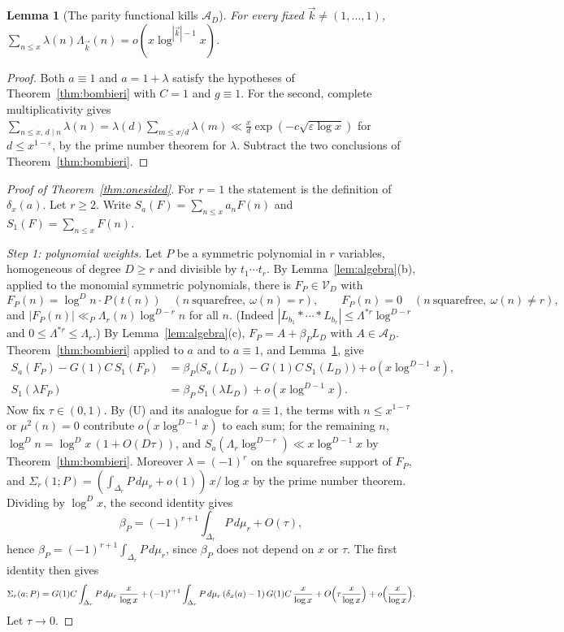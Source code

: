 \documentclass[11pt]{amsart}
\newtheorem{lemma}[theorem]{Lemma}
\theoremstyle{definition}
\theoremstyle{remark}
\begin{document}
\begin{lemma}[The parity functional kills $\mathcal A_D$]\label{lem:liouville}
For every fixed $\vec k\ne(1,\dots,1)$, $\sum_{n\le x}\lambda(n)\Lambda_{\vec k}(n)=o(x\log^{|\vec k|-1}x)$.
\end{lemma}
\begin{proof}
Both $a\equiv1$ and $a=1+\lambda$ satisfy the hypotheses of Theorem~\ref{thm:bombieri} with $C=1$ and $g\equiv1$. For the second, complete multiplicativity gives $\sum_{n\le x,\,d\mid n}\lambda(n)=\lambda(d)\sum_{m\le x/d}\lambda(m)\ll\frac xd\exp(-c\sqrt{\varepsilon\log x})$ for $d\le x^{1-\varepsilon}$, by the prime number theorem for $\lambda$. Subtract the two conclusions of Theorem~\ref{thm:bombieri}.
\end{proof}

\begin{proof}[Proof of Theorem~\ref{thm:onesided}]
For $r=1$ the statement is the definition of $\delta_x(a)$. Let $r\ge2$. Write $S_a(F)=\sum_{n\le x}a_nF(n)$ and $S_1(F)=\sum_{n\le x}F(n)$.

\emph{Step 1: polynomial weights.} Let $P$ be a symmetric polynomial in $r$ variables, homogeneous of degree $D\ge r$ and divisible by $t_1\cdots t_r$. By Lemma~\ref{lem:algebra}(b), applied to the monomial symmetric polynomials, there is $F_P\in\mathcal V_D$ with
\[
F_P(n)=\log^Dn\cdot P(t(n))\quad(n\ \text{squarefree},\ \omega(n)=r),\qquad F_P(n)=0\quad(n\ \text{squarefree},\ \omega(n)\ne r),
\]
and $|F_P(n)|\ll_P\Lambda_r(n)\log^{D-r}n$ for all $n$. (Indeed $|L_{b_1}*\cdots*L_{b_r}|\le\Lambda^{*r}\log^{D-r}$ and $0\le\Lambda^{*r}\le\Lambda_r$.) By Lemma~\ref{lem:algebra}(c), $F_P=A+\beta_PL_D$ with $A\in\mathcal A_D$. Theorem~\ref{thm:bombieri} applied to $a$ and to $a\equiv1$, and Lemma~\ref{lem:liouville}, give
\begin{align*}
S_a(F_P)-G(1)C\,S_1(F_P)&=\beta_P\bigl(S_a(L_D)-G(1)C\,S_1(L_D)\bigr)+o(x\log^{D-1}x),\\
S_1(\lambda F_P)&=\beta_P\,S_1(\lambda L_D)+o(x\log^{D-1}x).
\end{align*}
Now fix $\tau\in(0,1)$. By (U) and its analogue for $a\equiv1$, the terms with $n\le x^{1-\tau}$ or $\mu^2(n)=0$ contribute $o(x\log^{D-1}x)$ to each sum; for the remaining $n$, $\log^Dn=\log^Dx\,(1+O(D\tau))$, and $S_a(\Lambda_r\log^{D-r})\ll x\log^{D-1}x$ by Theorem~\ref{thm:bombieri}. Moreover $\lambda=(-1)^r$ on the squarefree support of $F_P$, and $\Sigma_r(1;P)=(\int_{\Delta_r}P\,d\mu_r+o(1))\,x/\log x$ by the prime number theorem. Dividing by $\log^Dx$, the second identity gives
\[
\beta_P=(-1)^{r+1}\int_{\Delta_r}P\,d\mu_r+O(\tau),
\]
hence $\beta_P=(-1)^{r+1}\int_{\Delta_r}P\,d\mu_r$, since $\beta_P$ does not depend on $x$ or $\tau$. The first identity then gives
\[
\Sigma_r(a;P)=G(1)C\int_{\Delta_r}P\,d\mu_r\,\frac x{\log x}+(-1)^{r+1}\int_{\Delta_r}P\,d\mu_r\,(\delta_x(a)-1)\,G(1)C\,\frac x{\log x}+O\Bigl(\tau\frac x{\log x}\Bigr)+o\Bigl(\frac x{\log x}\Bigr).
\]
Let $\tau\to0$.


\end{proof}
\end{document}
